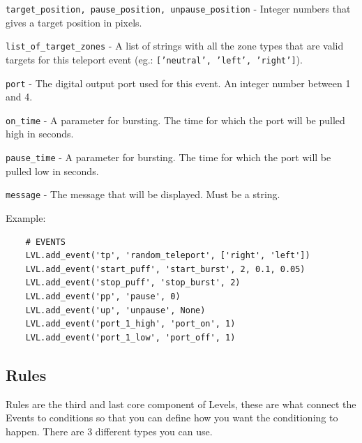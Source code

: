 \documentclass[11pt,a4paper]{article}
\newcommand{\param}[1]{\item \texttt{#1} -}
\begin{document}
\begin{paramlist}
\param{target\_position, pause\_position, unpause\_position} Integer numbers that gives a target position in pixels.
\param{list\_of\_target\_zones} A list of strings with all the zone types that are valid targets for this teleport event (eg.: \texttt{['neutral', 'left', 'right']}).
\param{port} The digital output port used for this event. An integer number between 1 and 4.
\param{on\_time} A parameter for bursting. The time for which the port will be pulled high in seconds.
\param{pause\_time} A parameter for bursting. The time for which the port will be pulled low in seconds.
\param{message} The message that will be displayed. Must be a string.
\end{paramlist}


Example:
\begin{lstlisting}
	# EVENTS
	LVL.add_event('tp', 'random_teleport', ['right', 'left'])
	LVL.add_event('start_puff', 'start_burst', 2, 0.1, 0.05)
	LVL.add_event('stop_puff', 'stop_burst', 2)
	LVL.add_event('pp', 'pause', 0)
	LVL.add_event('up', 'unpause', None)
	LVL.add_event('port_1_high', 'port_on', 1)
	LVL.add_event('port_1_low', 'port_off', 1)
\end{lstlisting}

\subsection{Rules \label{sec:rules}}
Rules are the third and last core component of Levels, these are what connect the Events to conditions so that you can define how you want the conditioning to happen. There are 3 different types you can use.\\
\end{document}
